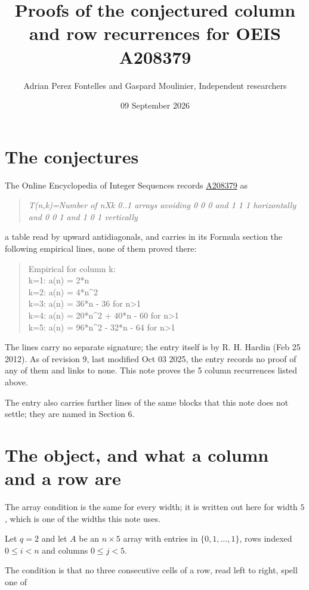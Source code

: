 \documentclass[11pt]{article}
\title{Proofs of the conjectured column and row recurrences for OEIS A208379}
\author{Adrian Perez Fontelles and Gaspard Moulinier, Independent researchers}
\date{09 September 2026}
\theoremstyle{definition}
\begin{document}
\maketitle
\section{The conjectures}

The Online Encyclopedia of Integer Sequences records \href{https://oeis.org/A208379}{A208379} as

\begin{quote}\itshape T(n,k)=Number of nXk 0..1 arrays avoiding 0 0 0 and 1 1 1 horizontally and 0 0 1 and 1 0 1 vertically\end{quote}

a table read by upward antidiagonals, and carries in its Formula section the following empirical lines, none of them proved there:

\begin{quote}\ttfamily Empirical for column k:\\
k=1: a(n) = 2*n\\k=2: a(n) = 4*n\textasciicircum{}2\\k=3: a(n) = 36*n - 36 for n>1\\k=4: a(n) = 20*n\textasciicircum{}2 + 40*n - 60 for n>1\\k=5: a(n) = 96*n\textasciicircum{}2 - 32*n - 64 for n>1\end{quote}

The lines carry no separate signature; the entry itself is by R. H. Hardin (Feb 25 2012). As of revision 9, last modified Oct 03 2025, the entry records no proof of any of them and links to none. This note proves the 5 column recurrences listed above.

The entry also carries further lines of the same blocks that this note does not settle; they are named in Section 6.

\section{The object, and what a column and a row are}

The array condition is the same for every width; it is written out here for width $5$, which is one of the widths this note uses.

Let $q = 2$ and let $A$ be an $n \times 5$ array with entries in $\{0,1,\dots,1\}$, rows indexed $0 \le i < n$ and columns $0 \le j < 5$.

The condition is that no three consecutive cells of a row, read left to right, spell one of
\end{document}
